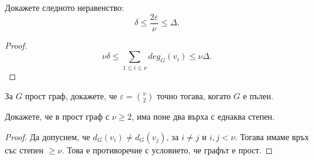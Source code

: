 \begin{problem}
  Докажете следното неравенство:
  \[\delta \leq \frac{2\varepsilon}{\nu} \leq \Delta.\]
\end{problem}
\begin{proof}
  \[\nu\delta \leq\sum_{1\leq i \leq\nu} deg_G(v_i) \leq \nu\Delta.\]
\end{proof}

\begin{problem}
  За $G$ прост граф, докажете, че $\varepsilon = \binom{\nu}{2}$ точно тогава, когато $G$ е пълен.
\end{problem}
  
  
\begin{problem}
  Докажете, че в прост граф с $\nu\geq 2$, има поне два върха с еднаква степен.
\end{problem}
\begin{proof}
  Да допуснем, че $d_G(v_i)\neq d_G(v_j)$, за $i\neq j$ и $i,j < \nu$.
  Тогава имаме връх със степен $\geq \nu$. Това е противоречие с условието, че графът е прост.
\end{proof}

